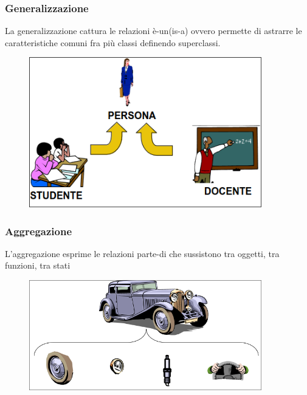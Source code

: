 \documentclass{report}
\begin{document}
                \subsubsection{Generalizzazione}
                    La generalizzazione cattura le relazioni è-un(is-a) ovvero permette di astrarre le caratteristiche comuni fra più classi definendo superclassi.
                    \begin{figure}[H]
                        \includegraphics[width=0.9\textwidth]{img/gen.png}
                    \end{figure}
                \subsubsection{Aggregazione}
                    L'aggregazione esprime le relazioni parte-di che sussistono tra oggetti, tra funzioni, tra stati
                    \begin{figure}[H]
                        \includegraphics[width=0.9\textwidth]{img/agr.png}
                    \end{figure}
\end{document}
